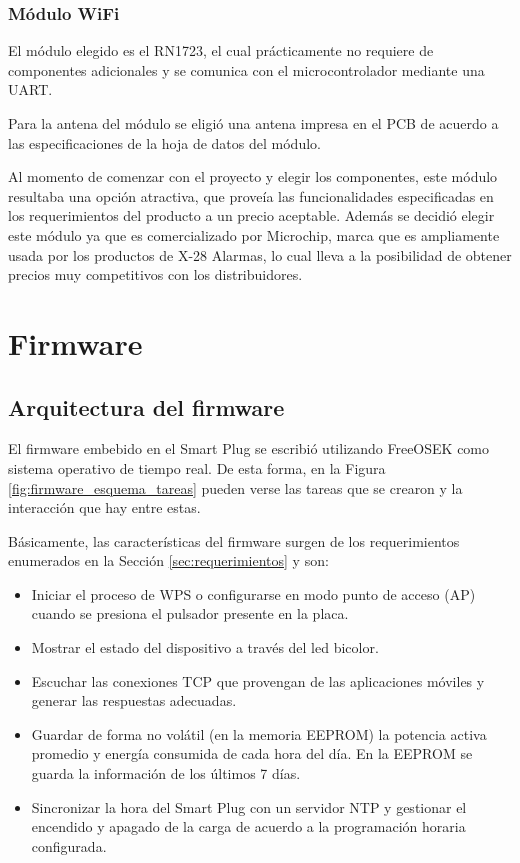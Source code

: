 \subsubsection{Módulo WiFi}

El módulo elegido es el RN1723, el cual prácticamente no requiere de componentes adicionales y se comunica con el microcontrolador mediante una UART.

Para la antena del módulo se eligió una antena impresa en el PCB de acuerdo a las especificaciones de la hoja de datos del módulo.

Al momento de comenzar con el proyecto y elegir los componentes, este módulo resultaba una opción atractiva, que proveía las funcionalidades especificadas en los requerimientos del producto a un precio aceptable. Además se decidió elegir este módulo ya que es comercializado por Microchip, marca que es ampliamente usada por los productos de X-28 Alarmas, lo cual lleva a la posibilidad de obtener precios muy competitivos con los distribuidores.

\section{Firmware}

\subsection{Arquitectura del firmware}
\label{subsec:firmware_arquitectura}

El firmware embebido en el Smart Plug se escribió utilizando FreeOSEK como sistema operativo de tiempo real. De esta forma, en la Figura \ref{fig:firmware_esquema_tareas} pueden verse las tareas que se crearon y la interacción que hay entre estas.

Básicamente, las características del firmware surgen de los requerimientos enumerados en la Sección \ref{sec:requerimientos} y son:

\begin{itemize}
\item Iniciar el proceso de WPS o configurarse en modo punto de acceso (AP) cuando se presiona el pulsador presente en la placa.
\item Mostrar el estado del dispositivo a través del led bicolor.
\item Escuchar las conexiones TCP que provengan de las aplicaciones móviles y generar las respuestas adecuadas.
\item Guardar de forma no volátil (en la memoria EEPROM) la potencia activa promedio y energía consumida de cada hora del día. En la EEPROM se guarda la información de los últimos 7 días.
\item  Sincronizar la hora del Smart Plug con un servidor NTP y gestionar el encendido y apagado de la carga de acuerdo a la programación horaria configurada.
\end{itemize}

